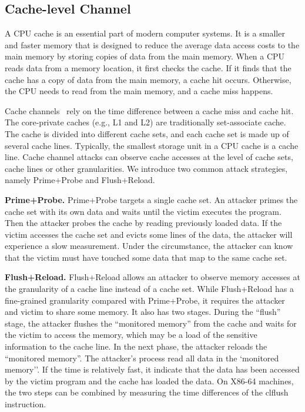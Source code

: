 \subsection{Cache-level Channel}
A CPU cache is an essential part of modern computer systems. It is a smaller and faster memory that is designed to reduce the average data access costs to the main memory by storing copies of data from the main memory. When a CPU reads data from a memory location, it first checks the cache. If it finds that the cache has a copy of data from the main memory, a cache hit occurs. Otherwise, the CPU needs to read from the main memory, and a cache miss happens.

Cache channels~\cite{yarom2017cachebleed,191010,184415,Osvik2006,liu2015last,184415} rely on the time difference between a cache miss and cache hit. The core-private caches (e.g., L1 and L2) are traditionally set-associate cache. The cache is divided into different cache sets, and each cache set is made up of several cache lines. Typically, the smallest storage unit in a CPU cache is a cache line. Cache channel attacks can observe cache accesses at the level of cache sets, cache lines or other granularities. We introduce two common attack strategies, namely Prime+Probe and Flush+Reload.

\textbf{Prime+Probe.} Prime+Probe targets a single cache set.
An attacker primes the cache set with its own data and waits until the victim executes the program. Then the attacker probes the cache by reading previously loaded data. If the victim accesses the cache set and evicts some lines of the data, the attacker will experience a slow measurement. Under the circumstance, the attacker can know that the victim must have touched some data that map to the same cache set.

\textbf{Flush+Reload.} Flush+Reload allows an attacker to observe memory accesses at the granularity of a cache line instead of a cache set. While Flush+Reload has a fine-grained granularity compared with Prime+Probe, it requires the attacker and victim to share some memory. It also has two stages. During the ``flush'' stage, the attacker flushes the ``monitored
memory'' from the cache and waits for the victim to access the memory, which may be a load of the sensitive information to the cache line.  In the next phase,
the attacker reloads the ``monitored memory''. The attacker's process read all data in the `monitored
memory''. If the time is relatively fast, it indicate that the data has been accessed by the victim program and the cache has loaded the data. 
On X86-64 machines, the two steps can be combined by measuring the time differences of the \textsf{clflush} instruction.


